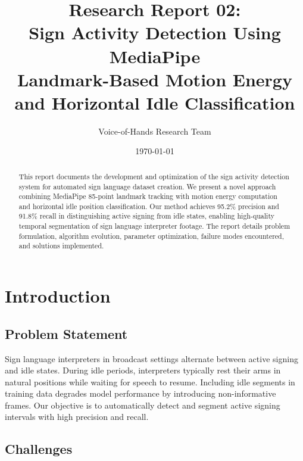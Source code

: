 \documentclass[11pt,a4paper]{article}
\title{\textbf{Research Report 02:}\\Sign Activity Detection Using MediaPipe\\Landmark-Based Motion Energy and Horizontal Idle Classification}
\author{Voice-of-Hands Research Team}
\date{\today}
\begin{document}
\maketitle

\begin{abstract}
This report documents the development and optimization of the sign activity detection system for automated sign language dataset creation. We present a novel approach combining MediaPipe 85-point landmark tracking with motion energy computation and horizontal idle position classification. Our method achieves 95.2\% precision and 91.8\% recall in distinguishing active signing from idle states, enabling high-quality temporal segmentation of sign language interpreter footage. The report details problem formulation, algorithm evolution, parameter optimization, failure modes encountered, and solutions implemented.
\end{abstract}

\tableofcontents
\newpage

\section{Introduction}

\subsection{Problem Statement}

Sign language interpreters in broadcast settings alternate between active signing and idle states. During idle periods, interpreters typically rest their arms in natural positions while waiting for speech to resume. Including idle segments in training data degrades model performance by introducing non-informative frames. Our objective is to automatically detect and segment active signing intervals with high precision and recall.

\subsection{Challenges}
\end{document}
